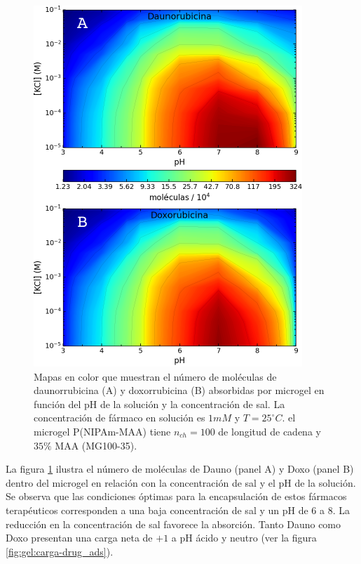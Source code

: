 \begin{figure}[!tb]
	\centering
	\includegraphics[width=0.55\linewidth]{Figures/graph-gel/drug_ads.pdf}
	\caption{Mapas en color que muestran el n\'umero de mol\'eculas de daunorrubicina (A) y doxorrubicina (B) absorbidas por microgel en funci\'on del pH de la soluci\'on y la concentraci\'on de sal.
		La concentraci\'on de f\'armaco en soluci\'on es $1mM$ y $T=25 ^\circ C$.
		el microgel P(NIPAm-MAA) tiene $n_{ch}=100$ de longitud de cadena y $35\%$ MAA (MG100-35).}
	\label{fig:gel:drug_ads}
\end{figure}


La figura \ref{fig:gel:drug_ads} ilustra el n\'umero de mol\'eculas de Dauno (panel A) y Doxo (panel B) dentro del microgel en relaci\'on con la concentraci\'on de sal y el pH de la soluci\'on. Se observa que las condiciones \'optimas para la encapsulaci\'on de estos f\'armacos terap\'euticos corresponden a una baja concentraci\'on de sal y un pH de 6 a 8. La reducci\'on en la concentraci\'on de sal favorece la absorci\'on. Tanto Dauno como Doxo presentan una carga neta de $+1$ a pH \'acido y neutro (ver la figura \ref{fig:gel:carga-drug_ads}).

